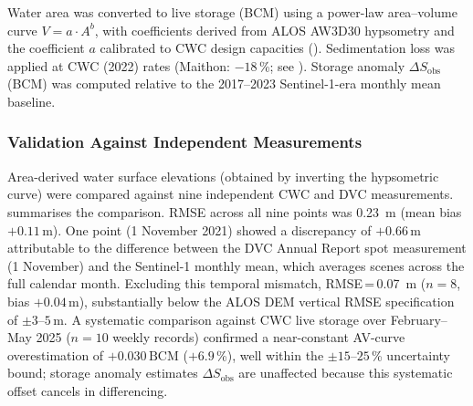 \documentclass[preprint,12pt,authoryear]{elsarticle}
\newcommand{\dSobs}{\Delta S_{\mathrm{obs}}}
\newcommand{\BCM}{\,\mathrm{BCM}}
\begin{document}
Water area was converted to live storage (BCM) using a power-law area--volume
curve $V = a \cdot A^b$, with coefficients derived from ALOS AW3D30 hypsometry
and the coefficient $a$ calibrated to CWC design capacities
(). Sedimentation loss was applied at CWC (2022) rates
(Maithon: $-18$\,\%; see ). Storage anomaly $\dSobs$
(BCM) was computed relative to the 2017--2023 Sentinel-1-era monthly mean
baseline.

\subsubsection{Validation Against Independent Measurements}
\label{sec:stage1_validation}

Area-derived water surface elevations (obtained by inverting the hypsometric
curve) were compared against nine independent CWC and DVC measurements.
 summarises the comparison. RMSE across all nine points
was \SI{0.23}{\metre} (mean bias $+0.11$\,m). One point (1 November 2021)
showed a discrepancy of $+0.66$\,m attributable to the difference between
the DVC Annual Report spot measurement (1 November) and the Sentinel-1 monthly
mean, which averages scenes across the full calendar month. Excluding this
temporal mismatch, RMSE\,=\,\SI{0.07}{\metre} ($n = 8$, bias $+0.04$\,m),
substantially below the ALOS DEM vertical RMSE specification of
$\pm 3$--$5$\,\si{\metre}. A systematic comparison against CWC live storage
over February--May 2025 ($n = 10$ weekly records) confirmed a near-constant
AV-curve overestimation of $+0.030\BCM$ ($+6.9$\,\%), well within the
$\pm 15$--$25$\,\% uncertainty bound; storage anomaly estimates $\dSobs$ are
unaffected because this systematic offset cancels in differencing.
\end{document}

